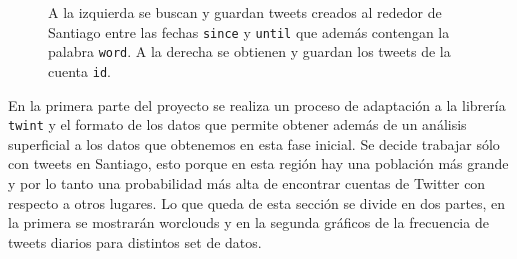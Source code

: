 \documentclass{article}
\begin{document}
\begin{figure}[H]

	\centering
	\caption{A la izquierda se buscan y guardan tweets creados al rededor de Santiago entre las fechas \texttt{since} y \texttt{until} que además contengan la palabra \texttt{word}. A la derecha se obtienen y guardan los tweets de la cuenta \texttt{id}.}
\end{figure}

En la primera parte del proyecto se realiza un proceso de adaptación a la librería \texttt{twint} y el formato de los datos que permite obtener además de un análisis superficial a los datos que obtenemos en esta fase inicial. Se decide trabajar sólo con tweets en Santiago, esto porque en esta región hay una población más grande y por lo tanto una probabilidad más alta de encontrar cuentas de Twitter con respecto a otros lugares. Lo que queda de esta sección se divide en dos partes, en la primera se mostrarán worclouds y en la segunda gráficos de la frecuencia de tweets diarios para distintos set de datos.
\end{document}
